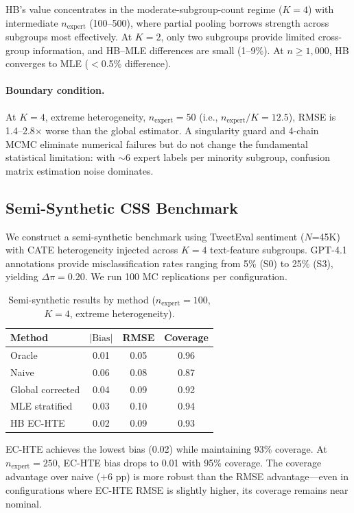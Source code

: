 \documentclass[11pt,a4paper]{article}
\newcommand{\DeltaPi}{\Delta\pi}
\begin{document}
HB's value concentrates in the moderate-subgroup-count regime ($K=4$) with intermediate $n_{\text{expert}}$ (100--500), where partial pooling borrows strength across subgroups most effectively.
At $K=2$, only two subgroups provide limited cross-group information, and HB--MLE differences are small (1--9\%).
At $n \geq 1{,}000$, HB converges to MLE ($<$0.5\% difference).

\paragraph{Boundary condition.}
At $K=4$, extreme heterogeneity, $n_{\text{expert}} = 50$ (i.e., $n_{\text{expert}}/K = 12.5$), RMSE is 1.4--2.8$\times$ worse than the global estimator.
A singularity guard and 4-chain MCMC eliminate numerical failures but do not change the fundamental statistical limitation: with $\sim$6 expert labels per minority subgroup, confusion matrix estimation noise dominates.


\subsection{Semi-Synthetic CSS Benchmark}\label{sec:semisynthetic}

We construct a semi-synthetic benchmark using TweetEval sentiment ($N$=45K) with CATE heterogeneity injected across $K=4$ text-feature subgroups.
GPT-4.1 annotations provide misclassification rates ranging from 5\% (S0) to 25\% (S3), yielding $\DeltaPi = 0.20$.
We run 100 MC replications per configuration.

\begin{table}[t]
\centering
\small
\caption{Semi-synthetic results by method ($n_{\text{expert}} = 100$, $K = 4$, extreme heterogeneity).}
\label{tab:semisynthetic}
\begin{tabular}{@{}lccc@{}}
\toprule
Method & $|\text{Bias}|$ & RMSE & Coverage \\
\midrule
Oracle & 0.01 & 0.05 & 0.96 \\
Naive & 0.06 & 0.08 & 0.87 \\
Global corrected & 0.04 & 0.09 & 0.92 \\
MLE stratified & 0.03 & 0.10 & 0.94 \\
HB EC-HTE & 0.02 & 0.09 & 0.93 \\
\bottomrule
\end{tabular}
\end{table}

EC-HTE achieves the lowest bias (0.02) while maintaining 93\% coverage.
At $n_{\text{expert}} = 250$, EC-HTE bias drops to 0.01 with 95\% coverage.
The coverage advantage over naive ($+$6 pp) is more robust than the RMSE advantage---even in configurations where EC-HTE RMSE is slightly higher, its coverage remains near nominal.
\end{document}
